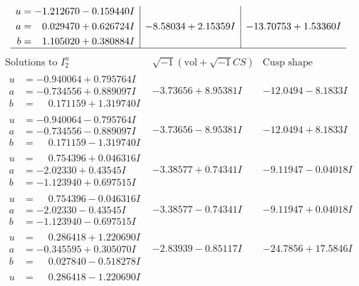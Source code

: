 \documentclass[1p]{elsarticle_modified}
\theoremstyle{definition}
\newcommand{\I}{\sqrt{-1}}
\begin{document}
$$\begin{array}{c|c|c}
\begin{aligned}
u &= -1.212670 - 0.159440 I \\
a &= \phantom{-}0.029470 + 0.626724 I \\
b &= \phantom{-}1.105020 + 0.380884 I\end{aligned}
 & -8.58034 + 2.15359 I & -13.70753 + 1.53360 I\\
 \hline 
 \end{array}$$\newpage$$\begin{array}{c|c|c}  
\text{Solutions to }I^u_{2}& \I (\text{vol} + \sqrt{-1}CS) & \text{Cusp shape}\\
 \hline 
\begin{aligned}
u &= -0.940064 + 0.795764 I \\
a &= -0.734556 + 0.889097 I \\
b &= \phantom{-}0.171159 + 1.319740 I\end{aligned}
 & -3.73656 + 8.95381 I & -12.0494 - 8.1833 I \\ \hline\begin{aligned}
u &= -0.940064 - 0.795764 I \\
a &= -0.734556 - 0.889097 I \\
b &= \phantom{-}0.171159 - 1.319740 I\end{aligned}
 & -3.73656 - 8.95381 I & -12.0494 + 8.1833 I \\ \hline\begin{aligned}
u &= \phantom{-}0.754396 + 0.046316 I \\
a &= -2.02330 + 0.43545 I \\
b &= -1.123940 + 0.697515 I\end{aligned}
 & -3.38577 + 0.74341 I & -9.11947 - 0.04018 I \\ \hline\begin{aligned}
u &= \phantom{-}0.754396 - 0.046316 I \\
a &= -2.02330 - 0.43545 I \\
b &= -1.123940 - 0.697515 I\end{aligned}
 & -3.38577 - 0.74341 I & -9.11947 + 0.04018 I \\ \hline\begin{aligned}
u &= \phantom{-}0.286418 + 1.220690 I \\
a &= -0.345595 + 0.305070 I \\
b &= \phantom{-}0.027840 - 0.518278 I\end{aligned}
 & -2.83939 - 0.85117 I & -24.7856 + 17.5846 I \\ \hline\begin{aligned}
u &= \phantom{-}0.286418 - 1.220690 I \\

\end{aligned}
\end{array}$$
\end{document}
